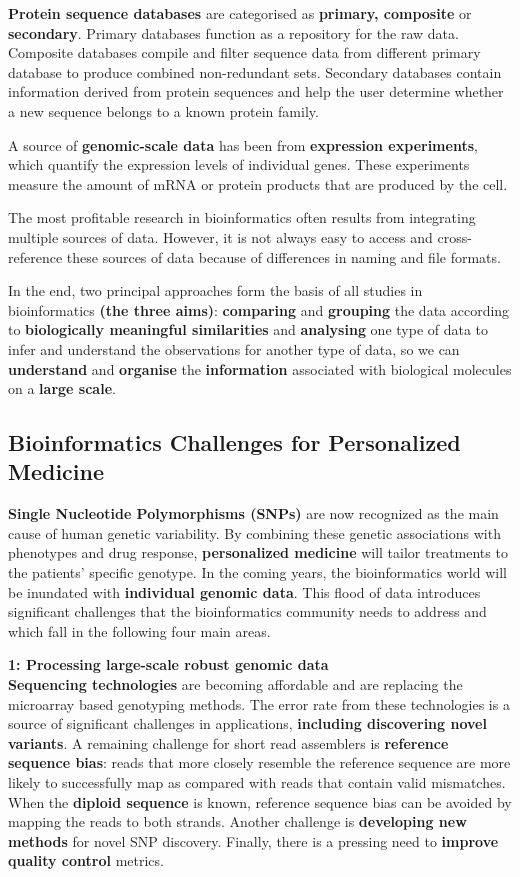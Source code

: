 \documentclass[10pt,a4paper]{report}
\begin{document}
	\textbf{Protein sequence databases} are categorised as \textbf{primary, composite} or \textbf{secondary}. Primary databases function as a repository for the raw data. Composite databases compile and filter sequence data from different primary database to produce combined non-redundant sets. Secondary databases contain information derived from protein sequences and help the user determine whether a new sequence belongs to a known protein family. 
	
	A source of \textbf{genomic-scale data} has been from \textbf{expression experiments}, which quantify the expression levels of individual genes. These experiments measure the amount of mRNA or protein products that are produced by the cell.
	
	The most profitable research in bioinformatics often results from integrating multiple sources of data. However, it is not always easy to access and cross-reference these sources of data because of differences in naming and file formats.
	
	In the end, two principal approaches form the basis of all studies in bioinformatics \textbf{(the three aims)}: \textbf{comparing} and \textbf{grouping} the data according to \textbf{biologically meaningful similarities} and \textbf{analysing} one type of data to infer and understand the observations for another type of data, so we can \textbf{understand} and \textbf{organise} the \textbf{information} associated with biological molecules on a \textbf{large scale}.
	
	\subsection{Bioinformatics Challenges for Personalized Medicine}
	\textbf{Single Nucleotide Polymorphisms (SNPs)} are now recognized as the main cause of human genetic variability.
	By combining these genetic associations with phenotypes and drug response, \textbf{personalized medicine} will tailor treatments to the patients’ specific genotype.
	In the coming years, the bioinformatics world will be inundated with \textbf{individual genomic data}. 
	This flood of data introduces significant challenges that the bioinformatics community needs to address and which fall in the following four main areas.
	
	\textbf{1: Processing large-scale robust genomic data}\\
	\textbf{Sequencing technologies} are becoming affordable and are replacing the microarray based genotyping methods.
	The error rate from these technologies is a source of significant challenges in applications, \textbf{including discovering novel variants}.
	A remaining challenge for short read assemblers is \textbf{reference sequence bias}: reads that more closely resemble the reference sequence are more likely to successfully map as compared with reads that contain valid mismatches.
	When the \textbf{diploid sequence} is known, reference sequence bias can be avoided by mapping the reads to both strands.
	Another challenge is \textbf{developing new methods} for novel SNP discovery.
	Finally, there is a pressing need to \textbf{improve quality control} metrics.
	
\end{document}
